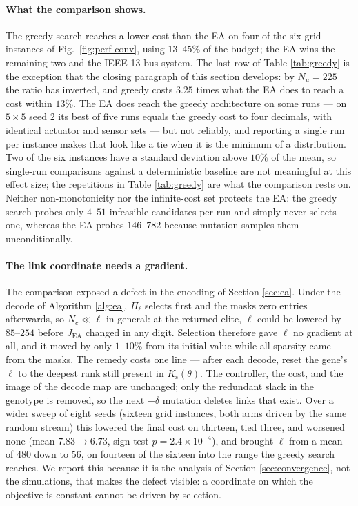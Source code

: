 \paragraph{What the comparison shows.}
The greedy search reaches a lower cost than the EA on four of the six grid
instances of Fig.~\ref{fig:perf-conv}, using $13$--$45\%$ of the budget; the EA
wins the remaining two and the IEEE 13-bus system. The last row of Table
\ref{tab:greedy} is the exception that the closing paragraph of this section
develops: by $N_u = 225$ the ratio has inverted, and greedy costs $3.25$ times
what the EA does to reach a cost within $13\%$. The EA does reach the greedy architecture on some runs
--- on $5\times5$ seed $2$ its best of five runs equals the greedy cost to four
decimals, with identical actuator and sensor sets --- but not reliably, and
reporting a single run per instance makes that look like a tie when it is the
minimum of a distribution. Two of the six instances have a standard deviation
above $10\%$ of the mean, so single-run comparisons against a deterministic
baseline are not meaningful at this effect size; the repetitions in Table
\ref{tab:greedy} are what the comparison rests on. Neither non-monotonicity nor
the infinite-cost set protects the EA: the greedy search probes only $4$--$51$
infeasible candidates per run and simply never selects one, whereas the EA
probes $146$--$782$ because mutation samples them unconditionally.

\paragraph{The link coordinate needs a gradient.}
The comparison exposed a defect in the encoding of Section \ref{sec:ea}. Under
the decode of Algorithm \ref{alg:ea}, $\Pi_\ell$ selects first and the masks
zero entries afterwards, so $N_c \ll \ell$ in general: at the returned elite,
$\ell$ could be lowered by $85$--$254$ before $J_\mathrm{EA}$ changed in any
digit. Selection therefore gave $\ell$ no gradient at all, and it moved by only
$1$--$10\%$ from its initial value while all sparsity came from the masks. The
remedy costs one line --- after each decode, reset the gene's $\ell$ to the
deepest rank still present in $K_\mathrm{s}(\theta)$. The controller, the cost,
and the image of the decode map are unchanged; only the redundant slack in the
genotype is removed, so the next $-\delta$ mutation deletes links that exist.
Over a wider sweep of eight seeds (sixteen grid instances, both arms driven by
the same random stream) this lowered the final cost on thirteen, tied three,
and worsened none (mean $7.83 \to 6.73$, sign test $p = 2.4\times10^{-4}$), and
brought $\ell$ from a mean of $480$ down to $56$, on fourteen of the sixteen
into the range the greedy search reaches. We report this because it is the
analysis of Section
\ref{sec:convergence}, not the simulations, that makes the defect visible: a
coordinate on which the objective is constant cannot be driven by selection.

